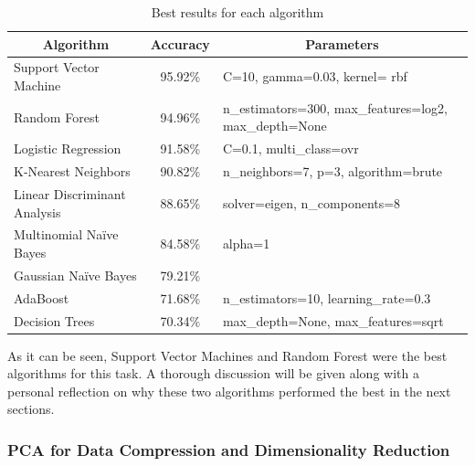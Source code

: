 \documentclass[letterpaper,10pt]{article}
\theoremstyle{mytheor}
\begin{document}
\begin{table}[H]
\centering
\begin{tabular}{|l|c|l|}
\hline
\multicolumn{1}{|c|}{\textbf{Algorithm}} & \textbf{Accuracy} & \multicolumn{1}{c|}{\textbf{Parameters}}          \\ \hline
Support Vector Machine                                      & 95.92\%           & C=10, gamma=0.03, kernel= rbf                     \\ \hline
Random Forest                             & 94.96\%           & n\_estimators=300, max\_features=log2, max\_depth=None \\ \hline
Logistic Regression                      & 91.58\%           & C=0.1, multi\_class=ovr                           \\ \hline
K-Nearest Neighbors                               & 90.82\%           & n\_neighbors=7, p=3, algorithm=brute                    \\ \hline
Linear Discriminant Analysis             & 88.65\%           & solver=eigen, n\_components=8                      \\ \hline
Multinomial Naïve Bayes                  & 84.58\%           & alpha=1                                           \\ \hline
Gaussian Naïve Bayes                     & 79.21\%           &                                                   \\ \hline
AdaBoost                                 & 71.68\%           & n\_estimators=10, learning\_rate=0.3                  \\ \hline
Decision Trees                           & 70.34\%           & max\_depth=None, max\_features=sqrt               \\ \hline
\end{tabular}
\caption{Best results for each algorithm}
\label{table:2}
\end{table}

As it can be seen, Support Vector Machines and Random Forest were the best algorithms for this task. A thorough discussion will be given along with a personal reflection on why these two algorithms performed the best in the next sections.

\subsubsection{PCA for Data Compression and Dimensionality Reduction}
\end{document}
